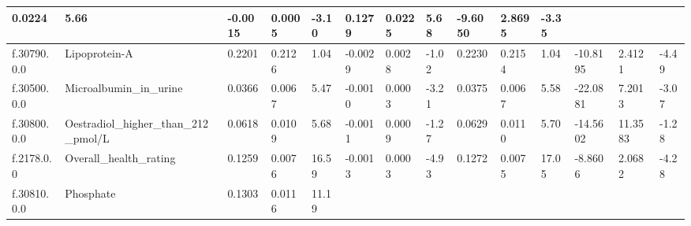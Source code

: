 \begin{longtable}{llllllllllllll}
  \multicolumn{1}{l|}{0.0224} &
  \multicolumn{1}{l|}{5.66} &
  \multicolumn{1}{l|}{-0.0015} &
  \multicolumn{1}{l|}{0.0005} &
  \multicolumn{1}{l|}{-3.10} &
  \multicolumn{1}{l|}{0.1279} &
  \multicolumn{1}{l|}{0.0225} &
  \multicolumn{1}{l|}{5.68} &
  \multicolumn{1}{l|}{-9.6050} &
  \multicolumn{1}{l|}{2.8695} &
  \multicolumn{1}{l|}{-3.35} \\ \hline
\multicolumn{1}{|l|}{f.30790.0.0} &
  \multicolumn{1}{l|}{Lipoprotein-A} &
  \multicolumn{1}{l|}{0.2201} &
  \multicolumn{1}{l|}{0.2126} &
  \multicolumn{1}{l|}{1.04} &
  \multicolumn{1}{l|}{-0.0029} &
  \multicolumn{1}{l|}{0.0028} &
  \multicolumn{1}{l|}{-1.02} &
  \multicolumn{1}{l|}{0.2230} &
  \multicolumn{1}{l|}{0.2154} &
  \multicolumn{1}{l|}{1.04} &
  \multicolumn{1}{l|}{-10.8195} &
  \multicolumn{1}{l|}{2.4121} &
  \multicolumn{1}{l|}{-4.49} \\ \hline
\multicolumn{1}{|l|}{f.30500.0.0} &
  \multicolumn{1}{l|}{Microalbumin\_in\_urine} &
  \multicolumn{1}{l|}{0.0366} &
  \multicolumn{1}{l|}{0.0067} &
  \multicolumn{1}{l|}{5.47} &
  \multicolumn{1}{l|}{-0.0010} &
  \multicolumn{1}{l|}{0.0003} &
  \multicolumn{1}{l|}{-3.21} &
  \multicolumn{1}{l|}{0.0375} &
  \multicolumn{1}{l|}{0.0067} &
  \multicolumn{1}{l|}{5.58} &
  \multicolumn{1}{l|}{-22.0881} &
  \multicolumn{1}{l|}{7.2013} &
  \multicolumn{1}{l|}{-3.07} \\ \hline
\multicolumn{1}{|l|}{f.30800.0.0} &
  \multicolumn{1}{l|}{Oestradiol\_higher\_than\_212\_pmol/L} &
  \multicolumn{1}{l|}{0.0618} &
  \multicolumn{1}{l|}{0.0109} &
  \multicolumn{1}{l|}{5.68} &
  \multicolumn{1}{l|}{-0.0011} &
  \multicolumn{1}{l|}{0.0009} &
  \multicolumn{1}{l|}{-1.27} &
  \multicolumn{1}{l|}{0.0629} &
  \multicolumn{1}{l|}{0.0110} &
  \multicolumn{1}{l|}{5.70} &
  \multicolumn{1}{l|}{-14.5602} &
  \multicolumn{1}{l|}{11.3583} &
  \multicolumn{1}{l|}{-1.28} \\ \hline
\multicolumn{1}{|l|}{f.2178.0.0} &
  \multicolumn{1}{l|}{Overall\_health\_rating} &
  \multicolumn{1}{l|}{0.1259} &
  \multicolumn{1}{l|}{0.0076} &
  \multicolumn{1}{l|}{16.59} &
  \multicolumn{1}{l|}{-0.0013} &
  \multicolumn{1}{l|}{0.0003} &
  \multicolumn{1}{l|}{-4.93} &
  \multicolumn{1}{l|}{0.1272} &
  \multicolumn{1}{l|}{0.0075} &
  \multicolumn{1}{l|}{17.05} &
  \multicolumn{1}{l|}{-8.8606} &
  \multicolumn{1}{l|}{2.0682} &
  \multicolumn{1}{l|}{-4.28} \\ \hline
\multicolumn{1}{|l|}{f.30810.0.0} &
  \multicolumn{1}{l|}{Phosphate} &
  \multicolumn{1}{l|}{0.1303} &
  \multicolumn{1}{l|}{0.0116} &
  \multicolumn{1}{l|}{11.19} &

\end{longtable}
